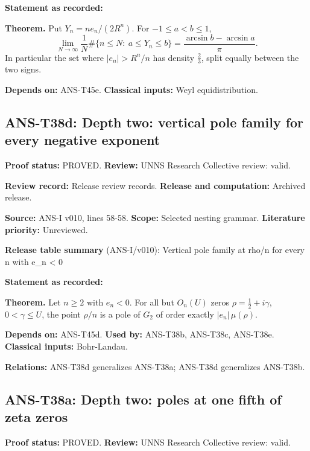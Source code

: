 \documentclass[
  11pt,
]{article}
\begin{document}
\textbf{Statement as recorded:}

\textbf{Theorem.} Put \(Y_n=ne_n/(2R^n)\). For \(-1\le a<b\le1\),
\[\lim_{N\to\infty}\frac1N\#\{n\le N:\ a\le Y_n\le b\}=\frac{\arcsin b-\arcsin a}\pi.\]
In particular the set where \(|e_n|>R^n/n\) has density \(\tfrac23\),
split equally between the two signs.

\textbf{Depends on:} ANS-T45e. \textbf{Classical inputs:} Weyl
equidistribution.

\hypertarget{ans-t38d-depth-two-vertical-pole-family-for-every-negative-exponent}{%
\subsection{ANS-T38d: Depth two: vertical pole family for every negative
exponent}\label{ans-t38d-depth-two-vertical-pole-family-for-every-negative-exponent}}

\textbf{Proof status:} PROVED. \textbf{Review:} UNNS Research Collective
review: valid.

\textbf{Review record:} Release review records. \textbf{Release and
computation:} Archived release.

\textbf{Source:} ANS-I v010, lines 58-58. \textbf{Scope:} Selected
nesting grammar. \textbf{Literature priority:} Unreviewed.

\textbf{Release table summary} (ANS-I/v010): Vertical pole family at
rho/n for every n with e\_n \textless{} 0

\textbf{Statement as recorded:}

\textbf{Theorem.} Let \(n\ge2\) with \(e_n<0\). For all but \(O_n(U)\)
zeros \(\rho=\tfrac12+i\gamma\), \(0<\gamma\le U\), the point \(\rho/n\)
is a pole of \(G_2\) of order exactly \(|e_n|\,\mu(\rho)\).

\textbf{Depends on:} ANS-T45d. \textbf{Used by:} ANS-T38b, ANS-T38c,
ANS-T38e. \textbf{Classical inputs:} Bohr-Landau.

\textbf{Relations:} ANS-T38d generalizes ANS-T38a; ANS-T38d generalizes
ANS-T38b.

\hypertarget{ans-t38a-depth-two-poles-at-one-fifth-of-zeta-zeros}{%
\subsection{ANS-T38a: Depth two: poles at one fifth of zeta
zeros}\label{ans-t38a-depth-two-poles-at-one-fifth-of-zeta-zeros}}

\textbf{Proof status:} PROVED. \textbf{Review:} UNNS Research Collective
review: valid.
\end{document}
